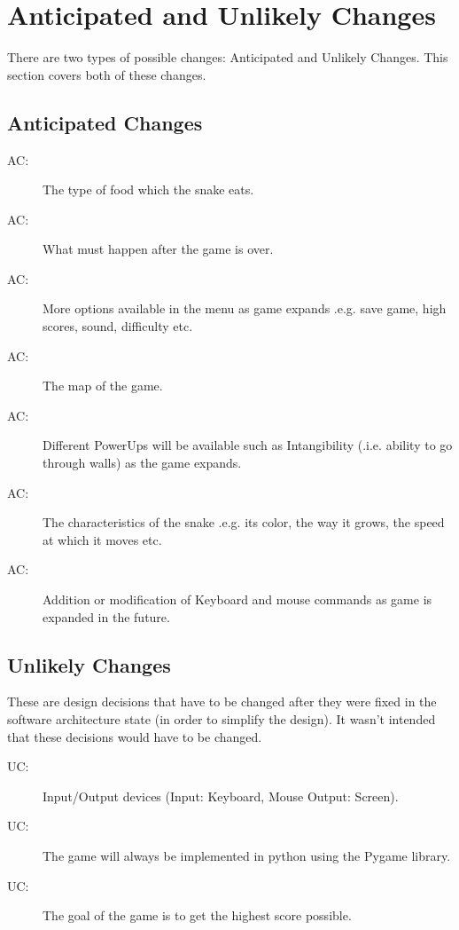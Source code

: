 \documentclass[12pt]{article}
\newcounter{acnum}
\newcommand{\actheacnum}{AC\theacnum}
\newcounter{ucnum}
\newcommand{\uctheucnum}{UC\theucnum}
\begin{document}
\section{Anticipated and Unlikely Changes} \label{SecChange}

There are two types of possible changes: Anticipated and Unlikely Changes. This section covers both of these changes.

\subsection{Anticipated Changes} \label{SecAchange}



\begin{description}
\item[ \actheacnum \label{acFood}:] The type of food which the snake eats.
\item[ \actheacnum \label{acGameOver}:] What must happen after the game is over.
\item[ \actheacnum \label{acMainMenu}:] More options available in the menu as game expands .e.g. save game, high scores, sound, difficulty etc.
\item[ \actheacnum \label{acPlayMap}:] The map of the game.
\item[ \actheacnum \label{acPowerUps}:] Different PowerUps will be available such as Intangibility (.i.e. ability to go through walls) as the game expands.
\item[ \actheacnum \label{acSnake}:] The characteristics of the snake .e.g. its color, the way it grows, the speed at which it moves etc.
\item[ \actheacnum \label{acInput}:] Addition or modification of Keyboard and mouse commands as game is expanded in the future.
\end{description}

\subsection{Unlikely Changes} \label{SecUchange}

These are design decisions that have to be changed after they were fixed in the software architecture state (in order to simplify the design). It wasn't intended that these decisions would have to be changed.

\begin{description}
\item[ \uctheucnum \label{ucIO}:] Input/Output devices
  (Input: Keyboard, Mouse Output: Screen).
\item[ \uctheucnum \label{ucPygame}:] The game will always be implemented in python using the Pygame library.
\item[ \uctheucnum \label{ucGoal}:] The goal of the game is to get the highest score possible.
\end{description}
\end{document}
